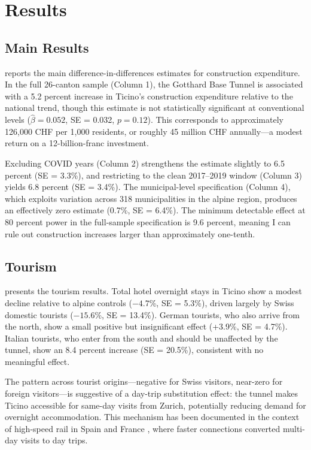 \documentclass[12pt]{article}
\begin{document}
\section{Results}

\subsection{Main Results}

 reports the main difference-in-differences estimates for construction expenditure. In the full 26-canton sample (Column 1), the Gotthard Base Tunnel is associated with a 5.2 percent increase in Ticino's construction expenditure relative to the national trend, though this estimate is not statistically significant at conventional levels ($\hat{\beta} = 0.052$, SE = 0.032, $p = 0.12$). This corresponds to approximately 126,000 CHF per 1,000 residents, or roughly 45 million CHF annually---a modest return on a 12-billion-franc investment.

Excluding COVID years (Column 2) strengthens the estimate slightly to 6.5 percent (SE = 3.3\%), and restricting to the clean 2017--2019 window (Column 3) yields 6.8 percent (SE = 3.4\%). The municipal-level specification (Column 4), which exploits variation across 318 municipalities in the alpine region, produces an effectively zero estimate (0.7\%, SE = 6.4\%). The minimum detectable effect at 80 percent power in the full-sample specification is 9.6 percent, meaning I can rule out construction increases larger than approximately one-tenth.

{\small}

\subsection{Tourism}

 presents the tourism results. Total hotel overnight stays in Ticino show a modest decline relative to alpine controls ($-4.7$\%, SE = 5.3\%), driven largely by Swiss domestic tourists ($-15.6$\%, SE = 13.4\%). German tourists, who also arrive from the north, show a small positive but insignificant effect (+3.9\%, SE = 4.7\%). Italian tourists, who enter from the south and should be unaffected by the tunnel, show an 8.4 percent increase (SE = 20.5\%), consistent with no meaningful effect.

The pattern across tourist origins---negative for Swiss visitors, near-zero for foreign visitors---is suggestive of a day-trip substitution effect: the tunnel makes Ticino accessible for same-day visits from Zurich, potentially reducing demand for overnight accommodation. This mechanism has been documented in the context of high-speed rail in Spain \citep{gutiérrez2020} and France \citep{delaplace2014}, where faster connections converted multi-day visits to day trips.
\end{document}
